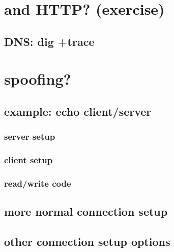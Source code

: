 \section{and HTTP? (exercise)}


\subsection{DNS: dig +trace}


\section{spoofing?}



\subsection{example: echo client/server}
\subsubsection{server setup}

\subsubsection{client setup}


\subsubsection{read/write code}



\subsection{more normal connection setup}



\subsection{other connection setup options}




